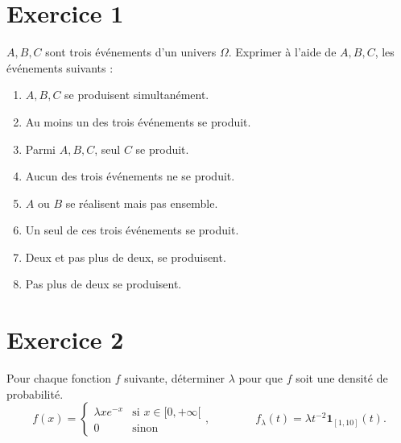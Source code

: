 \vspace{1cm}

\section*{Exercice 1}
$A, B, C$ sont trois événements d'un univers $\Omega$. Exprimer à l'aide de $A, B, C$, les événements suivants :
\begin{enumerate}
    \item $A, B, C$ se produisent simultanément.
    \item Au moins un des trois événements se produit.
    \item Parmi $A, B, C$, seul $C$ se produit.
    \item Aucun des trois événements ne se produit.
    \item $A$ ou $B$ se réalisent mais pas ensemble.
    \item Un seul de ces trois événements se produit.
    \item Deux et pas plus de deux, se produisent.
    \item Pas plus de deux se produisent.
\end{enumerate}
\vspace{1cm}

\section*{Exercice 2}
Pour chaque fonction $f$ suivante, déterminer $\lambda$ pour que $f$ soit une densité de probabilité.
\[
f(x)=
\begin{cases}
    \lambda x e^{-x} & \text{si } x \in [0, +\infty[ \\
    0 & \text{sinon}
    \end{cases}, 
\qquad \qquad 
f_\lambda(t)=\lambda t^{-2} \mathbf{1}_{[1,10]}(t).
\]

